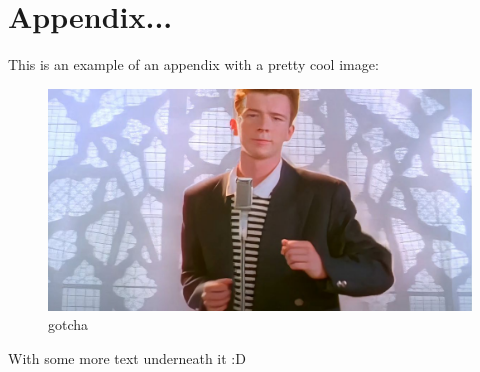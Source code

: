 \chapter{Appendix...}

This is an example of an appendix with a pretty cool image:

\begin{figure}[H]
	\centering
	\includegraphics[width=\textwidth]{assets/example-asset.jpg}
	\caption{gotcha}
	\label{fig:rick_roll}
\end{figure}

With some more text underneath it :D